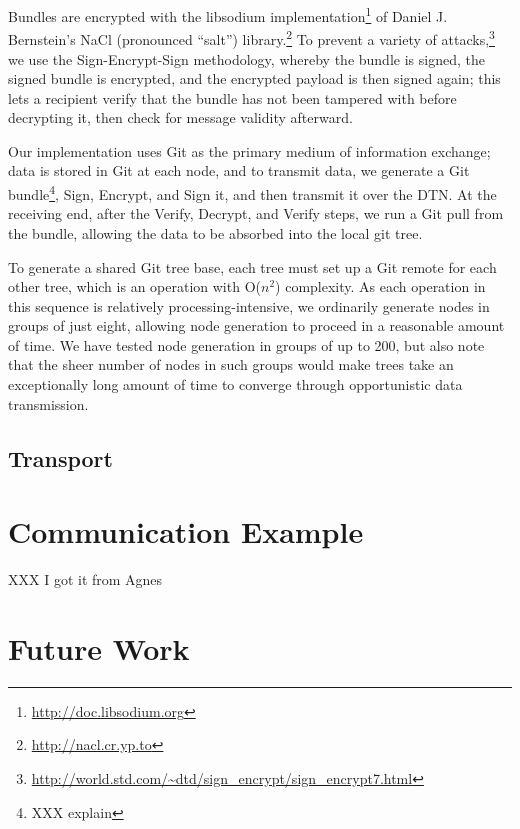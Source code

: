 \documentclass[12pt]{article}
\begin{document}
    Bundles are encrypted with the libsodium implementation\footnote{\url{http://doc.libsodium.org}} of Daniel J. Bernstein's NaCl (pronounced ``salt'') library.\footnote{\url{http://nacl.cr.yp.to}} To prevent a variety of attacks,\footnote{\url{http://world.std.com/~dtd/sign_encrypt/sign_encrypt7.html}} we use the Sign-Encrypt-Sign methodology, whereby the bundle is signed, the signed bundle is encrypted, and the encrypted payload is then signed again; this lets a recipient verify that the bundle has not been tampered with before decrypting it, then check for message validity afterward.
    
    Our implementation uses Git as the primary medium of information exchange; data is stored in Git at each node, and to transmit data, we generate a Git bundle\footnote{XXX explain}, Sign, Encrypt, and Sign it, and then transmit it over the DTN. At the receiving end, after the Verify, Decrypt, and Verify steps, we run a Git pull from the bundle, allowing the data to be absorbed into the local git tree.
    
    To generate a shared Git tree base, each tree must set up a Git remote for each other tree, which is an operation with O($n^2$) complexity. As each operation in this sequence is relatively processing-intensive, we ordinarily generate nodes in groups of just eight, allowing node generation to proceed in a reasonable amount of time. We have tested node generation in groups of up to 200, but also note that the sheer number of nodes in such groups would make trees take an exceptionally long amount of time to converge through opportunistic data transmission.
    
  \subsection{Transport}
  
  \section{Communication Example}
  
  XXX I got it from Agnes
  
  \section{Future Work}
\end{document}
